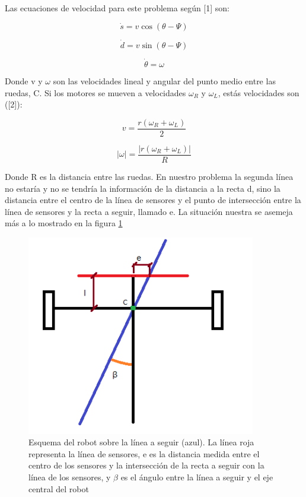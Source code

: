 \documentclass[10pt,conference,a4paper,onecolumn]{article}%
\begin{document}
Las ecuaciones de velocidad para este problema según [1] son:

\begin{equation}
\dot{s}=v \cos (\theta - \Psi)
\end{equation}

\begin{equation}
\dot{d}=v \sin (\theta - \Psi)
\end{equation}

\begin{equation}
\dot{\theta}=\omega  
\end{equation}

Donde v y $\omega$ son las velocidades lineal y angular del punto medio entre las ruedas, C. Si los motores se mueven a velocidades $\omega_R$ y $\omega_L$, estás velocidades son ([2]):

\begin{equation}
v=\frac{r(\omega _R + \omega _L)}{2}
\end{equation}


\begin{equation}
\vert \omega \vert	=\frac{ \vert r(\omega _R + \omega _L) \vert }{R}
\end{equation}

Donde R es la distancia entre las ruedas. 
En nuestro problema la segunda línea no estaría y no se tendría la información de la distancia a la recta d, sino la distancia entre el centro de la línea de sensores y el punto de intersección entre la línea de sensores y la recta a seguir, llamado e.  La situación nuestra se asemeja más a lo mostrado en la figura \ref{fig:carrito1}

\begin{figure}[h]
\centering
\includegraphics[width=10cm]{./imagenes/carrito1.png}
\caption{Esquema del robot sobre la línea a seguir (azul). La línea roja representa la línea de sensores, e es la distancia medida entre el centro de los sensores y la intersección de la recta a seguir con la línea de los sensores, y $\beta $ es el ángulo entre la línea a seguir y el eje central del robot}
\label{fig:carrito1}
\end{figure}
\end{document}
